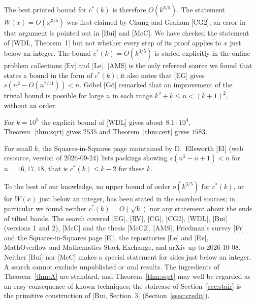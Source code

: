 \documentclass[11pt]{amsart}
\newcommand{\cs}{c^{*}}
\theoremstyle{definition}
\theoremstyle{remark}
\numberwithin{equation}{section}
\begin{document}
The best printed bound for $\cs(k)$ is therefore $O(k^{3/5})$. The statement $W(x)=O(x^{3/5})$ was first claimed by
Chung and Graham [CG2]; an error in that argument is pointed out in [Bui] and [McC]. We have checked the statement of
[WDL, Theorem~1] but not whether every step of its proof applies to $x$ just below an integer. The bound
$\cs(k)=O(k^{3/5})$ is stated explicitly in the online problem collections [Ev] and [Le]. [AMS] is the only refereed
source we found that states a bound in the form of $\cs(k)$; it also notes that [EG] gives $s(n^2-O(n^{7/11}))<n$.
G\"obel [G\"o] remarked that an improvement of the trivial bound is possible for large $n$ in each range
$k^2+k\le n<(k+1)^2$, without an order.

For $k=10^5$ the explicit bound of [WDL] gives about $8.1\cdot10^4$, Theorem~\ref{thm:sqrt} gives $2535$ and
Theorem~\ref{thm:cert} gives $1583$.

For small $k$, the Squares-in-Squares page maintained by D.~Ellsworth [El] (web resource, version of 2026-09-24) lists
packings showing $s(n^2-n+1)<n$ for $n=16,17,18$, that is $\cs(k)\le k-2$ for these $k$.

To the best of our knowledge, no upper bound of order $o(k^{3/5})$ for $\cs(k)$, or for $W(x)$ just below an integer,
has been stated in the searched sources; in particular we found neither $\cs(k)=O(\sqrt k)$ nor any statement about
the ends of tilted bands. The search covered [EG], [RV], [CG], [CG2], [WDL], [Bui] (versions 1 and 2), [McC] and the
thesis [McC2], [AMS], Friedman's survey [Fr] and the Squares-in-Squares page [El], the repositories [Le] and [Ev],
MathOverflow and Mathematics Stack Exchange, and arXiv up to 2026-10-08. Neither [Bui] nor [McC] makes a special
statement for sides just below an integer. A search cannot exclude unpublished or oral results. The ingredients of
Theorem~\ref{thm:A} are standard, and Theorem~\ref{thm:sqrt} may well be regarded as an easy consequence of known
techniques; the staircase of Section~\ref{sec:stair} is the primitive construction of [Bui, Section~3]
(Section~\ref{ssec:credit}).
\end{document}

